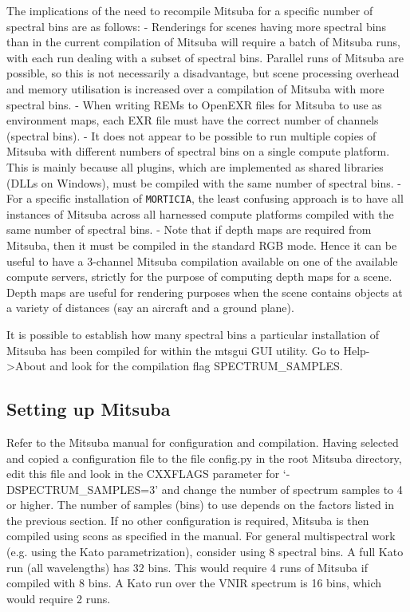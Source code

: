 The implications of the need to recompile Mitsuba for a specific number
of spectral bins are as follows: - Renderings for scenes having more
spectral bins than in the current compilation of Mitsuba will require a
batch of Mitsuba runs, with each run dealing with a subset of spectral
bins. Parallel runs of Mitsuba are possible, so this is not necessarily
a disadvantage, but scene processing overhead and memory utilisation is
increased over a compilation of Mitsuba with more spectral bins. - When
writing REMs to OpenEXR files for Mitsuba to use as environment maps,
each EXR file must have the correct number of channels (spectral bins).
- It does not appear to be possible to run multiple copies of Mitsuba
with different numbers of spectral bins on a single compute platform.
This is mainly because all plugins, which are implemented as shared
libraries (DLLs on Windows), must be compiled with the same number of
spectral bins. - For a specific installation of \texttt{MORTICIA}, the
least confusing approach is to have all instances of Mitsuba across all
harnessed compute platforms compiled with the same number of spectral
bins. - Note that if depth maps are required from Mitsuba, then it must
be compiled in the standard RGB mode. Hence it can be useful to have a
3-channel Mitsuba compilation available on one of the available compute
servers, strictly for the purpose of computing depth maps for a scene.
Depth maps are useful for rendering purposes when the scene contains
objects at a variety of distances (say an aircraft and a ground plane).

It is possible to establish how many spectral bins a particular
installation of Mitsuba has been compiled for within the mtsgui GUI
utility. Go to Help-\textgreater{}About and look for the compilation
flag SPECTRUM\_SAMPLES.

\subsection{Setting up Mitsuba}\label{setting-up-mitsuba}

Refer to the Mitsuba manual for configuration and compilation. Having
selected and copied a configuration file to the file config.py in the
root Mitsuba directory, edit this file and look in the CXXFLAGS
parameter for `-DSPECTRUM\_SAMPLES=3' and change the number of spectrum
samples to 4 or higher. The number of samples (bins) to use depends on
the factors listed in the previous section. If no other configuration is
required, Mitsuba is then compiled using scons as specified in the
manual. For general multispectral work (e.g. using the Kato
parametrization), consider using 8 spectral bins. A full Kato run (all
wavelengths) has 32 bins. This would require 4 runs of Mitsuba if
compiled with 8 bins. A Kato run over the VNIR spectrum is 16 bins,
which would require 2 runs.

